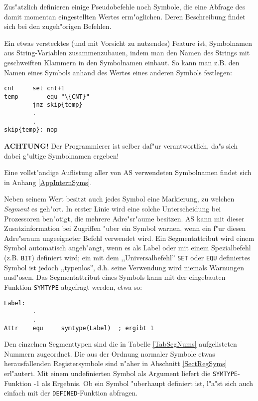 \documentclass[12pt,a4paper,twoside]{report}
\newcommand{\bb}[1]{{\bf #1}}
\newcommand{\tty}[1]{{\tt #1}}
\begin{document}
Zus"atzlich definieren einige Pseudobefehle noch Symbole, die eine
Abfrage des damit momentan eingestellten Wertes erm"oglichen.  Deren
Beschreibung findet sich bei den zugeh"origen Befehlen.
\par
Ein etwas verstecktes (und mit Vorsicht zu nutzendes) Feature ist,
Symbolnamen aus String-Variablen zusammenzubauen, indem man den
Namen des Strings mit geschweiften Klammern in den Symbolnamen
einbaut.  So kann man z.B. den Namen eines Symbols anhand des
Wertes eines anderen Symbols festlegen:
\begin{verbatim}
cnt		set	cnt+1
temp		equ	"\{CNT}"
		jnz	skip{temp}
		.
		.
skip{temp}:	nop
\end{verbatim}
\bb{ACHTUNG!}  Der Programmierer ist selber daf"ur verantwortlich,
da"s sich dabei g"ultige Symbolnamen ergeben!
\par
Eine vollst"andige Auflistung aller von AS verwendeten Symbolnamen
findet sich in Anhang \ref{AppInternSyms}.
\par
Neben seinem Wert besitzt auch jedes Symbol eine Markierung, zu welchen
{\em Segment} es geh"ort.  In erster Linie wird eine solche Unterscheidung
bei Prozessoren ben"otigt, die mehrere Adre"sr"aume besitzen.  AS kann mit
dieser Zusatzinformation bei Zugriffen "uber ein Symbol warnen, wenn ein
f"ur diesen Adre"sraum ungeeigneter Befehl verwendet wird.  Ein
Segmentattribut wird einem Symbol automatisch angeh"angt, wenn es als Label
oder mit einem Spezialbefehl (z.B. \tty{BIT}) definiert wird; ein mit
dem ,,Universalbefehl'' \tty{SET} oder \tty{EQU} definiertes Symbol ist
jedoch ,,typenlos'', d.h. seine Verwendung wird niemals Warnungen
ausl"osen.  Das Segmentattribut eines Symbols kann mit der eingebauten
Funktion \tty{SYMTYPE} abgefragt werden, etwa so:
\begin{verbatim}
Label:
        .
        .
Attr    equ     symtype(Label)  ; ergibt 1
\end{verbatim}
Den einzelnen Segmenttypen sind die in Tabelle \ref{TabSegNums}
aufgelisteten Nummern zugeordnet.  Die aus der Ordnung normaler Symbole
etwas herausfallenden Registersymbole sind n"aher in Abschnitt
\ref{SectRegSyms} erl"autert.  Mit einem undefinierten Symbol als Argument
liefert die \tty{SYMTYPE}-Funktion -1 als Ergebnis.  Ob ein Symbol "uberhaupt
definiert ist, l"a"st sich auch einfach mit der \tty{DEFINED}-Funktion abfragen.
\end{document}
